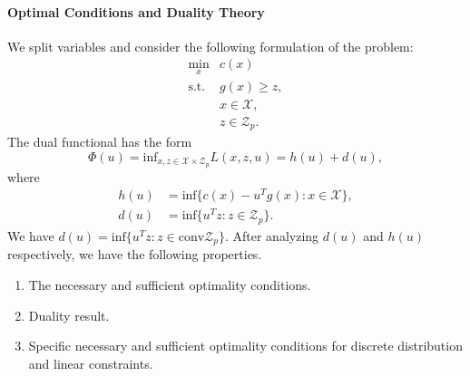 \documentclass[a4pper,11pt]{article}
\begin{document}
\paragraph{Optimal Conditions and Duality Theory}
We split variables and consider the following formulation of the problem:
\begin{equation}
    \label{4.1}
    \begin{array}{ll}
        \min_x   & c(x) \\
        \text{s.t.} & g(x)\geq z,\\
        & x\in \mathcal X,\\
        & z\in \mathcal Z_p.
    \end{array}
\end{equation}
The dual functional has the form
$$
\Phi(u)=\text{inf}_{x,z\in \mathcal X\times \mathcal Z_p} L(x,z,u)=h(u)+d(u),
$$
where
$$
\begin{aligned}
h(u)&=\text{inf}\{c(x)-u^Tg(x):x\in\mathcal X\},\\
d(u)&=\text{inf}\{u^Tz:z\in \mathcal Z_p\}.
\end{aligned}
$$
We have $d(u)=\text{inf}\{u^Tz:z\in \text{conv} \mathcal Z_p\}$.
After analyzing $d(u)$ and $h(u)$ respectively, we have the following properties.
\begin{enumerate}
\item The necessary and sufficient optimality conditions.\\
\item Duality result.\\
\item Specific necessary and sufficient optimality conditions for discrete distribution and linear constraints.\\
\end{enumerate}
\end{document}
